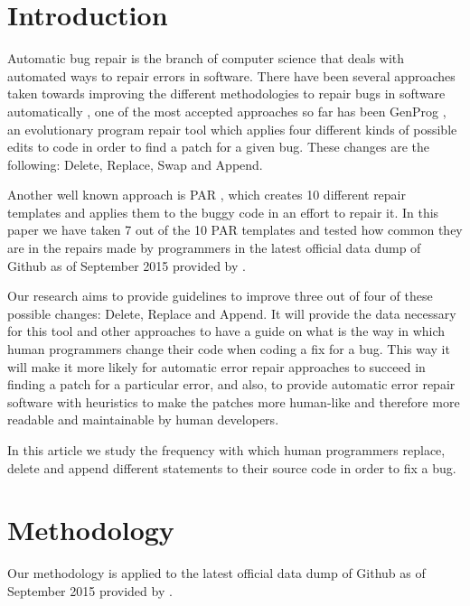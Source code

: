 \documentclass{sig-alternate-05-2015}
\begin{document}


\section{Introduction}
Automatic bug repair is the branch of computer science that deals with automated ways to repair errors in software. There have been several approaches taken towards improving the different methodologies to repair bugs in software automatically \cite{dongsun}\cite{weimer}\cite{claire} \cite{kai}, one of the most accepted approaches so far has been GenProg \cite{weimer}\cite{claire}, an evolutionary program repair tool which applies four different kinds of possible edits to code in order to find a patch for a given bug. These changes are the following: Delete, Replace, Swap and Append. 

Another well known approach is PAR \cite{dongsun}, which creates 10 different repair templates and applies them to the buggy code in an effort to repair it. In this paper we have taken 7 out of the 10 PAR templates and tested how common they are in the repairs made by programmers in the latest official data dump of Github as of September 2015 provided by \cite{robert}.

Our research aims to provide guidelines to improve three out of four of these possible changes: Delete, Replace and Append. It will provide the data necessary for this tool and other approaches to have a guide on what is the way in which human programmers change their code when coding a fix for a bug. This way it will make it more likely for automatic error repair approaches to succeed in finding a patch for a particular error, and also, to provide automatic error repair software with heuristics to make the patches more human-like and therefore more readable and maintainable by human developers.

In this article we study the frequency with which human programmers replace, delete and append different statements to their source code in order to fix a bug.


\section{Methodology}
Our methodology is applied to the latest official data dump of Github as of September 2015 provided by \cite{robert}.
\end{document}
